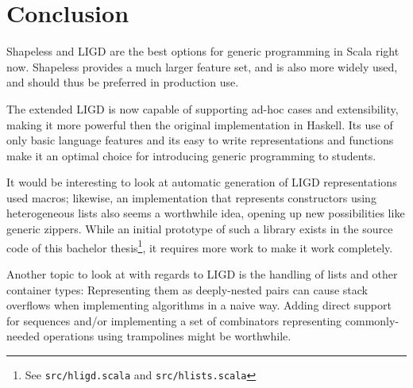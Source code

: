 \chapter{Conclusion}
Shapeless and LIGD are the best options for generic programming in Scala
right now. Shapeless provides a much larger feature set, and is also more
widely used, and should thus be preferred in production use.

The extended LIGD is now capable of supporting ad-hoc cases and extensibility,
making it more powerful then the original implementation in Haskell. Its use
of only basic language features and its easy to write representations and
functions make it an optimal choice for introducing generic programming to
students.

It would be interesting to look at automatic generation of LIGD representations
used macros; likewise, an implementation that represents constructors using
heterogeneous lists also seems a worthwhile idea, opening up new possibilities
like generic zippers. While an initial prototype of such a library exists in
the source code of this bachelor thesis\footnote{See \texttt{src/hligd.scala} and
\texttt{src/hlists.scala}\cite{src}}, it requires more work to make it work completely.

Another topic to look at with regards to LIGD is the handling of lists and
other container types: Representing them as deeply-nested pairs can cause
stack overflows when implementing algorithms in a naive way. Adding direct
support for sequences and/or implementing a set of combinators representing
commonly-needed operations using trampolines might be worthwhile.
